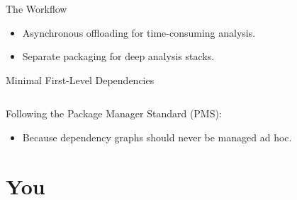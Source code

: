 			\begin{frame}{The Workflow}
				\begin{itemize}
					\item Asynchronous offloading for time-consuming analysis.
					\item Separate packaging for deep analysis stacks.
				\end{itemize}
				\vspace{-2em}
				\begin{figure}
					\centering
				\end{figure}
			\end{frame}
			\begin{frame}{Minimal First-Level Dependencies}
				\inputminted[bgcolor=tlg,firstline=18,lastline=25]{bash}{.gentoo/app-text/repsep/repsep-99999.ebuild}
				Following the Package Manager Standard (PMS):
				\begin{itemize}
					\item Because dependency graphs should never be managed ad hoc.
				\end{itemize}
			\end{frame}
	\section{You}
